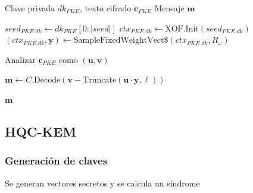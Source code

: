 \begin{tcolorbox}[hqcbox,title=\textbf{Algoritmo HQC–PKE.Decrypt}]
\begin{algorithmic}[1]
\Require Clave privada $\textit{dk}_{PKE}$, texto cifrado $\mathbf{c}_{PKE}$
\Ensure Mensaje $\mathbf{m}$

\State $\textit{seed}_{PKE.dk} \gets \textit{dk}_{PKE}[0{:}|\textit{seed}|]$
\State $\textit{ctx}_{PKE.dk} \gets \text{XOF.Init}(\textit{seed}_{PKE.dk})$
\State $(\textit{ctx}_{PKE.dk}, \mathbf{y}) \gets \text{SampleFixedWeightVect\$}(\textit{ctx}_{PKE.dk}, R_\omega)$

\State Analizar $\mathbf{c}_{PKE}$ como $(\mathbf{u}, \mathbf{v})$

\State $\mathbf{m} \gets C.\text{Decode}(\mathbf{v} - \text{Truncate}(\mathbf{u}\cdot\mathbf{y}, \ell))$

\State \Return $\mathbf{m}$
\end{algorithmic}
\end{tcolorbox}

\subsection{HQC-KEM}

\subsubsection{Generación de claves}
Se generan vectores secretos y se calcula un síndrome

\newcommand{\triComment}[1]{\Statex $\triangleright$ \textit{#1}}

